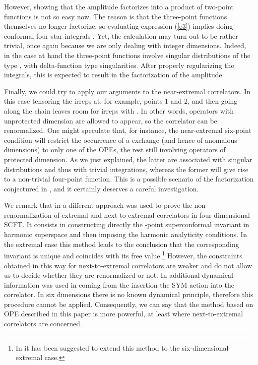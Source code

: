 \documentclass[a4paper,11pt]{article}
\begin{document}
However, showing that the amplitude factorizes into a product of two-point
functions is not so easy now. The reason is that the three-point functions
\coordHE{} themselves no longer factorize,
so evaluating expression (\ref{e3}) implies doing conformal
four-star integrals \cite{Symanzik}. Yet, the calculation may turn out to be
rather trivial, once again because we are only dealing with integer dimensions.
Indeed, in the case at hand the three-point functions \coordHE{} involve singular distributions of the type \coordHE{},
\coordHE{} with delta-function type singularities. After properly regularizing
the integrals, this is expected to result in the factorization of the
amplitude.

Finally, we could try to apply our arguments to the near-extremal correlators.
In this case tensoring the \coordHE{} irreps at, for example,
points 1 and 2, and
then going along the chain leaves room for irreps \myHighlight{$[2j,m_1+m_2-2k-2j]$}\coordHE{} with
\coordHE{}. In other words, operators with unprotected dimension are allowed to
appear, so the correlator can be renormalized. One might speculate that, for
instance, the near-extremal six-point condition \coordHE{}
will restrict the occurrence of a \coordHE{} exchange (and hence of anomalous
dimensions) to only one of the OPEs, the rest still involving operators of
protected dimension. As we just explained, the latter are associated with
singular distributions and thus with trivial integrations, whereas the former
will give rise to a non-trivial four-point function. This is a possible
scenario of the factorization conjectured in \cite{D'Hoker:2000dm,DP}, and it
certainly deserves a careful investigation.

We remark that in \cite{DHoFrMaMaRa1} a different approach was used
to prove the non-renormalization of extremal and next-to-extremal correlators
in four-dimensional SCFT. It consists in constructing directly the \coordHE{}-point
superconformal invariant in harmonic superspace and then imposing the harmonic
analyticity conditions. In the extremal case this method leads to the
conclusion that the corresponding invariant is unique and coincides with its
free value.\footnote{In \cite{Htensor} it has been suggested to extend this
method to the six-dimensional extremal case.} However, the constraints obtained
in this way for next-to-extremal correlators are weaker and do not allow us to
decide whether they are renormalized or not. In \cite{DHoFrMaMaRa1} additional
dynamical information was used in coming from the insertion the SYM action into
the correlator. In six dimensions there is no known dynamical principle,
therefore this procedure cannot be applied. Consequently, we can say that the
method based on OPE described in this paper is more powerful, at least where
next-to-extremal correlators are concerned.
\end{document}

